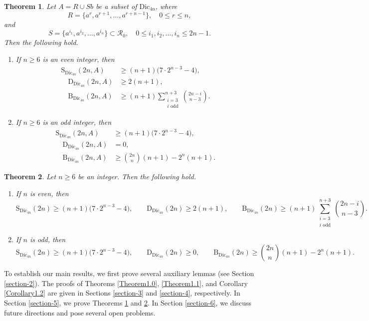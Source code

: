 \documentclass[11pt,reqno]{amsart}
\numberwithin{equation}{section}
\newtheorem{theorem}{Theorem}[section]
\begin{document}
\begin{theorem}\label{Theorem1.7}
Let $A=R \cup Sb$ be a subset of $\mathrm{Dic_{4n}}$, where  $$R=\{a^{r},a^{r+1},\ldots,a^{r+n-1}\}, \quad 0\leq r\leq n,$$  and $$S=\{a^{i_1},a^{i_2},\ldots, a^{i_n}\}\subset \mathcal{R}_0, \quad 0\leq i_1,i_2,\ldots, i_n\leq 2n-1.$$  Then the following hold.
\begin{enumerate}
    \item[\upshape(1)] If $n\geq6$ is an even integer, then
      $$\begin{aligned}
  \mathrm{S}_{\mathrm{Dic}_{4n}}(2n,A) &\geq (n+1)\bigl(7\cdot 2^{n-3}-4\bigr),\\[8pt] 
  \quad
   \mathrm{D}_{\mathrm{Dic}_{4n}}(2n,A)&\geq 2(n+1) ,\\[8pt]
   \quad
    \mathrm{B}_{\mathrm{Dic}_{4n}}(2n,A)&\geq (n+1)\sum_{\substack{i=3\\i\text{~odd}}}^{n+3}\binom{2n-i}{n-3} .
    \end{aligned}
    $$
    \item[\upshape(2)] If $n\geq6$ is an odd integer, then
      $$\begin{aligned}
    \mathrm{S}_{\mathrm{Dic}_{4n}}(2n,A) &\geq (n+1)\bigl(7\cdot 2^{n-3}-4\bigr),\\[8pt]
   \quad \mathrm{D}_{\mathrm{Dic}_{4n}}(2n,A)&=0,\\[8pt]
  \quad  \mathrm{B}_{\mathrm{Dic}_{4n}}(2n,A)&\geq\binom{2n}{n}(n+1)-2^{n}(n+1).
    \end{aligned}
    $$
\end{enumerate}
\end{theorem}
\begin{theorem}\label{Theorem 1.9}
  Let $n\geq6$ be an integer. Then the following hold.
\begin{enumerate}
    \item[\upshape(1)] If $n$ is even, then
    $$
    \mathrm{S}_{\mathrm{Dic}_{4n}}(2n)\geq (n+1)\bigl(7\cdot 2^{n-3}-4\bigr), \qquad
    \mathrm{D}_{\mathrm{Dic}_{4n}}(2n)\geq 2(n+1) , \qquad
    \mathrm{B}_{\mathrm{Dic}_{4n}}(2n)\geq (n+1)\sum_{\substack{i=3\\i\text{~odd}}}^{n+3}\binom{2n-i}{n-3} .
    $$
    \item[\upshape(2)] If $n$ is odd, then
    $$
    \mathrm{S}_{\mathrm{Dic}_{4n}}(2n)\geq (n+1)\bigl(7\cdot 2^{n-3}-4\bigr), \qquad
    \mathrm{D}_{\mathrm{Dic}_{4n}}(2n)\geq 0 , \qquad
    \mathrm{B}_{\mathrm{Dic}_{4n}}(2n)\geq  \binom{2n}{n}(n+1)-2^{n}(n+1).
    $$
\end{enumerate}  
\end{theorem}
To establish our main results, we first prove several auxiliary lemmas (see Section \ref{section-2}). The proofs of Theorems \ref{Theorem1.0}, \ref{Theorem1.1}, and Corollary \ref{Corollary1.2} are given in Sections \ref{section-3} and \ref{section-4}, respectively. In Section \ref{section-5}, we prove Theorems \ref{Theorem1.7} and  \ref{Theorem 1.9}. In Section \ref{section-6}, we discuss future directions and pose several open problems.
\end{document}
